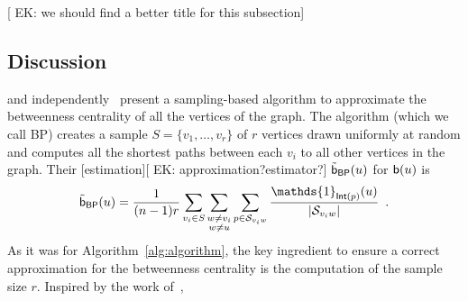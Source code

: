 [ EK: we should find a better title for this subsection]
\subsection{Discussion}\label{sec:discussion}
\citet{JacobKLPT05} and independently~\citet{BrandesP07} present a
sampling-based algorithm to approximate the betweenness centrality of all the
vertices of the graph. The algorithm (which we call \textsf{BP}) creates a
sample $S=\{v_1,\dotsc,v_r\}$ of $r$ vertices drawn uniformly at random and
computes all the shortest paths between each $v_i$ to all other vertices in the
graph. Their [estimation][ EK: approximation?estimator?] $\tilde{\mathsf{b}}_\mathsf{BP}(u)$ for $\mathsf{b}(u)$ is
\[ 
\tilde\betw_\mathsf{BP}(u)= \frac{1}{(n-1)r}\sum_{v_i\in S}\sum_{\substack{w\neq
v_i\\w\neq
u}}\sum_{p\in\mathcal{S}_{v_iw}}\frac{\mathds{1}_{\mathsf{Int}(p)}(u)}{|\mathcal{S}_{v_iw}|}\enspace.
\]
As it was for Algorithm~\ref{alg:algorithm}, the key ingredient to ensure a correct
approximation for the betweenness centrality is the computation of the sample
size $r$. Inspired by the work of~\citet{EppsteinW04}, \citet{BrandesP07} 
%
